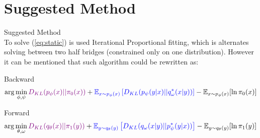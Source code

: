 \documentclass[10pt,pdf,hyperref={unicode}]{beamer}
\begin{document}
\section{Suggested Method}
\begin{frame}{Suggested Method}
~\\[-1mm]
To solve (\ref{eq:static}) is used Iterational Proportional fitting, which is alternates solving between two half bridges (constrained only on one distribution). However it can be mentioned that such algorithm could be rewritten as:
\begin{block}{Backward}
    \begin{equation*}
        \arg\min_{\phi, \psi} {\color{violet}D_{KL}(p_\phi(x)||\pi_0(x))} + {\color{blue}\mathbb{E}_{x\sim p_\phi(x)}\left[D_{KL}(p_\psi(y|x)||q^*_\omega(x|y))\right]} - \mathbb{E}_{x\sim p_\phi(x)}[\ln \pi_0(x)]
    \end{equation*}
\end{block}

\begin{block}{Forward}
    \begin{equation*}
        \arg\min_{\theta, \omega} {\color{violet}D_{KL}(q_\theta(x)||\pi_1(y))} + {\color{blue}\mathbb{E}_{y\sim q_\theta(y)}\left[D_{KL}(q_\omega(x|y)||p^*_\psi(y|x))\right]}  - \mathbb{E}_{y\sim q_\theta(y)}[\ln \pi_1(y)]
    \end{equation*}
\end{block}
\end{frame}
\end{document}

